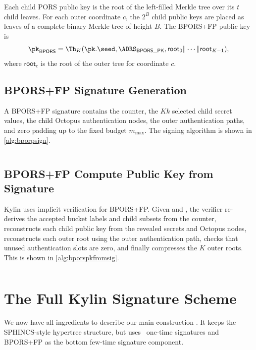 Each child PORS public key is the root of the left-filled Merkle tree over its
$t$ child leaves.  For each outer coordinate $c$, the $2^B$ child public keys
are placed as leaves of a complete binary Merkle tree of height $B$.  The
BPORS+FP public key is
\[
    \pk_{\mathsf{BPORS}}
    =\Th_K(\pk.\seed,\ADRS_{\mathsf{BPORS\_PK}},
           \mathsf{root}_0\|\cdots\|\mathsf{root}_{K-1}),
\]
where $\mathsf{root}_c$ is the root of the outer tree for coordinate $c$.

\subsection{BPORS+FP Signature Generation}

A BPORS+FP signature contains the counter, the $Kk$ selected child secret
values, the child Octopus authentication nodes, the outer authentication
paths, and zero padding up to the fixed budget $m_{\max}$.  The signing
algorithm is shown in \cref{alg:bporpsign}.

\begin{algorithm}
    \inputminted[breaklines,linenos,tabsize=2,mathescape,escapeinside=||]{C}{paper/code/bpors_sign.cs}
    \caption{\texttt{bpors\_sign} --- Generate a BPORS+FP signature and public key.}
    \label{alg:bporpsign}
\end{algorithm}

\subsection{BPORS+FP Compute Public Key from Signature}

Kylin uses implicit verification for BPORS+FP.  Given \sigbpors and \md, the
verifier re-derives the accepted bucket labels and child subsets from the
counter, reconstructs each child public key from the revealed secrets and
Octopus nodes, reconstructs each outer root using the outer authentication
path, checks that unused authentication slots are zero, and finally compresses
the $K$ outer roots.  This is shown in \cref{alg:bporspkfromsig}.

\begin{algorithm}
    \inputminted[breaklines,linenos,tabsize=2,mathescape,escapeinside=||]{C}{paper/code/bpors_pkFromSig.cs}
    \caption{\texttt{bpors\_pkFromSig} --- Compute a BPORS+FP public key from a signature.}
    \label{alg:bporspkfromsig}
\end{algorithm}


\section{The Full Kylin Signature Scheme}
\label{sec:spx-core}
We now have all ingredients to describe our main construction \SPHINCSA.  It
keeps the SPHINCS-style hypertree structure, but uses \WOTSCS\ one-time
signatures and BPORS+FP as the bottom few-time signature component.

